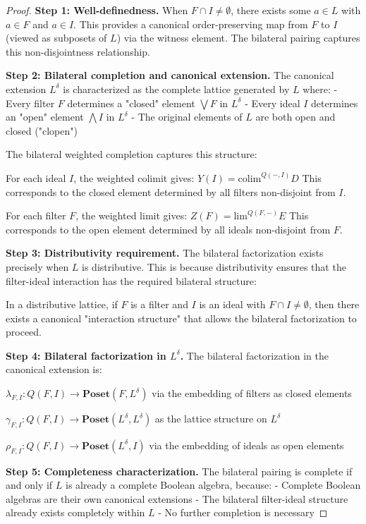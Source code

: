 \documentclass[11pt]{article}
\theoremstyle{plain}
\theoremstyle{definition}
\theoremstyle{remark}
\newcommand{\colim}{\mathrm{colim}}
\renewcommand{\lim}{\mathrm{lim}}
\begin{document}
\begin{proof}
\textbf{Step 1: Well-definedness.}
When $F \cap I \neq \emptyset$, there exists some $a \in L$ with $a \in F$ and $a \in I$. This provides a canonical order-preserving map from $F$ to $I$ (viewed as subposets of $L$) via the witness element. The bilateral pairing captures this non-disjointness relationship.

\textbf{Step 2: Bilateral completion and canonical extension.}
The canonical extension $L^{\delta}$ is characterized as the complete lattice generated by $L$ where:
- Every filter $F$ determines a "closed" element $\bigvee F$ in $L^{\delta}$
- Every ideal $I$ determines an "open" element $\bigwedge I$ in $L^{\delta}$
- The original elements of $L$ are both open and closed ("clopen")

The bilateral weighted completion captures this structure:

For each ideal $I$, the weighted colimit gives:
$Y(I) = \colim^{Q(-, I)} D$
This corresponds to the closed element determined by all filters non-disjoint from $I$.

For each filter $F$, the weighted limit gives:
$Z(F) = \lim^{Q(F, -)} E$  
This corresponds to the open element determined by all ideals non-disjoint from $F$.

\textbf{Step 3: Distributivity requirement.}
The bilateral factorization exists precisely when $L$ is distributive. This is because distributivity ensures that the filter-ideal interaction has the required bilateral structure:

In a distributive lattice, if $F$ is a filter and $I$ is an ideal with $F \cap I \neq \emptyset$, then there exists a canonical "interaction structure" that allows the bilateral factorization to proceed.

\textbf{Step 4: Bilateral factorization in $L^{\delta}$.}
The bilateral factorization in the canonical extension is:

$\lambda_{F,I} : Q(F, I) \to \mathbf{Poset}(F, L^{\delta})$ via the embedding of filters as closed elements

$\gamma_{F,I} : Q(F, I) \to \mathbf{Poset}(L^{\delta}, L^{\delta})$ as the lattice structure on $L^{\delta}$

$\rho_{F,I} : Q(F, I) \to \mathbf{Poset}(L^{\delta}, I)$ via the embedding of ideals as open elements

\textbf{Step 5: Completeness characterization.}
The bilateral pairing is complete if and only if $L$ is already a complete Boolean algebra, because:
- Complete Boolean algebras are their own canonical extensions
- The bilateral filter-ideal structure already exists completely within $L$
- No further completion is necessary
\end{proof}
\end{document}
